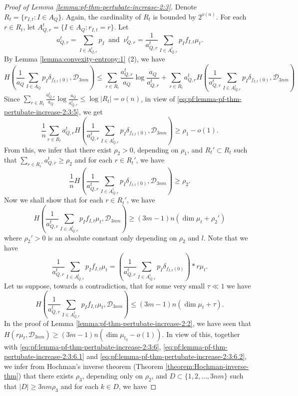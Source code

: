 \documentclass[a4paper,11pt]{amsart}
\theoremstyle{definition}
\numberwithin{equation}{section}
\def\D{\mathcal{D}}
\begin{document}
\begin{proof}[Proof of Lemma \ref{lemma:pf-thm-pertubate-increase-2:3}]
Denote $R_t=\{r_{I,t} : I\in A_Q\}$.  Again,  the cardinality of $R_t$ is bounded by $2^{o(n)}$.   For each $r\in R_t$,  let $A_{Q,r}^t=\{I\in A_Q: r_{I,t} = r\}$.  Let 
\[
a_{Q,r}^t=\sum_{I\in A_{Q,r}^t}p_I \  \textrm{ and } \  \nu_{Q,r}^t=\frac{1}{a_{Q,r}^t} \sum_{I\in A_{Q,r}^t} p_If_{I,t}\mu_t.
\]
By Lemma \ref{lemma:convexity-entropy:1} (2), we have 
\[
H\left(\frac{1}{a_Q}\sum_{I\in A_Q}p_I \delta_{f_{I,t}(0)},  \D_{3nm}\right) \le \sum_{r\in R_t} \frac{a_{Q,r}^t}{a_Q}\log \frac{a_Q}{a_{Q,r}^t} +\sum_{r\in R_t}a_{Q,r}^t H\left(\frac{1}{a_{Q,r}^t}\sum_{I\in A_{Q,r}^t}p_I \delta_{f_{I,t}(0)},  \D_{3nm}\right)
\]
Since $\sum_{r\in R_t} \frac{a_{Q,r}^t}{a_Q}\log \frac{a_Q}{a_{Q,r}^t}\le \log |R_t|=o(n)$,  in view of \eqref{eq:pf:lemma-pf-thm-pertubate-increase-2:3:5}, we get
\[
\frac{1}{n}\sum_{r\in R_t}a_{Q,r}^t H\left(\frac{1}{a_{Q,r}^t}\sum_{I\in A_{Q,r}^t}p_I \delta_{f_{I,t}(0)},  \D_{3nm}\right) \ge \rho_1-o(1).
\]
From this,  we infer that there exist $\rho_2>0$, depending on $\rho_1$, and $R_t'\subset R_t$ such that $\sum_{r\in R_t' } a_{Q,r}^t\ge \rho_2$ and for each $r\in R_t'$,  we have
\begin{equation}\label{eq:pf:lemma-pf-thm-pertubate-increase-2:3:6}
\frac{1}{n}H\left(\frac{1}{a_{Q,r}^t}\sum_{I\in A_{Q,r}^t}p_I \delta_{f_{I,t}(0)},  \D_{3nm}\right) \ge \rho_2.
\end{equation}
Now we shall show that for each $r\in R_t'$,  we have
\begin{equation}\label{eq:pf:lemma-pf-thm-pertubate-increase-2:3:6.0}
H\left(\frac{1}{a_{Q,r}^t}\sum_{I\in A_{Q,r}^t}p_I f_{I,t}\mu_t,  \D_{3nm}\right) \ge  (3m-1)n(\dim\mu_t+\rho_2')
\end{equation}
where  $\rho_2'>0$ is an absolute constant only depending on $\rho_2$ and $l$.
Note that we have
\begin{equation}\label{eq:pf:lemma-pf-thm-pertubate-increase-2:3:6.1}
\frac{1}{a_{Q,r}^t}\sum_{I\in A_{Q,r}^t}p_I f_{I,t}\mu_t = \left(\frac{1}{a_{Q,r}^t}\sum_{I\in A_{Q,r}^t}p_I \delta_{f_{I,t}(0)}\right) * r\mu_t.
\end{equation}
Let us suppose, towards a contradiction,  that for some very small $\tau\ll 1$ we have
\begin{equation}\label{eq:pf:lemma-pf-thm-pertubate-increase-2:3:6.2}
H\left(\frac{1}{a_{Q,r}^t}\sum_{I\in A_{Q,r}^t}p_I f_{I,t}\mu_t,  \D_{3nm}\right) \le  (3m-1)n(\dim\mu_t+\tau).
\end{equation}
In the proof of Lemma \ref{lemma:pf-thm-pertubate-increase-2:2}, we have seen that 
$H(r\mu_t,\D_{3nm})\ge (3m-1)n(\dim\mu_{t_0}-o(1))$.  In view of this, together with \eqref{eq:pf:lemma-pf-thm-pertubate-increase-2:3:6},  \eqref{eq:pf:lemma-pf-thm-pertubate-increase-2:3:6.1} and \eqref{eq:pf:lemma-pf-thm-pertubate-increase-2:3:6.2}, we infer from Hochman's inverse theorem (Theorem \ref{theorem:Hochman-inverse-thm}) that there exists $\rho_3$, depending  only on $\rho_2$,  and $D\subset \{1,2, \ldots,3nm\}$ such that $|D|\ge 3nm\rho_3$ and for each $k\in D$, we have

\end{proof}
\end{document}
